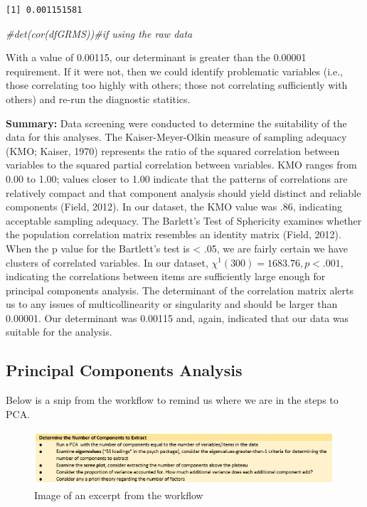 \documentclass[
  english,
]{book}
\newenvironment{Shaded}{\begin{snugshade}}{\end{snugshade}}
\newcommand{\CommentTok}[1]{\textcolor[rgb]{0.56,0.35,0.01}{\textit{#1}}}
\begin{document}
\begin{verbatim}
[1] 0.001151581
\end{verbatim}

\begin{Shaded}
\begin{Highlighting}[]
\CommentTok{#det(cor(dfGRMS))#if using the raw data}
\end{Highlighting}
\end{Shaded}

With a value of 0.00115, our determinant is greater than the 0.00001 requirement. If it were not, then we could identify problematic variables (i.e., those correlating too highly with others; those not correlating sufficiently with others) and re-run the diagnostic statitics.

\textbf{Summary:} Data screening were conducted to determine the suitability of the data for this analyses. The Kaiser-Meyer-Olkin measure of sampling adequacy (KMO; Kaiser, 1970) represents the ratio of the squared correlation between variables to the squared partial correlation between variables. KMO ranges from 0.00 to 1.00; values closer to 1.00 indicate that the patterns of correlations are relatively compact and that component analysis should yield distinct and reliable components (Field, 2012). In our dataset, the KMO value was .86, indicating acceptable sampling adequacy. The Barlett's Test of Sphericity examines whether the population correlation matrix resembles an identity matrix (Field, 2012). When the p value for the Bartlett's test is \textless{} .05, we are fairly certain we have clusters of correlated variables. In our dataset, \(\chi ^{1}(300)=1683.76, p < .001\), indicating the correlations between items are sufficiently large enough for principal components analysis. The determinant of the correlation matrix alerts us to any issues of multicollinearity or singularity and should be larger than 0.00001. Our determinant was 0.00115 and, again, indicated that our data was suitable for the analysis.

\hypertarget{principal-components-analysis}{%
\subsection{Principal Components Analysis}\label{principal-components-analysis}}

Below is a snip from the workflow to remind us where we are in the steps to PCA.

\begin{figure}
\centering
\includegraphics{images/PCA/NumComponents.png}
\caption{Image of an excerpt from the workflow}
\end{figure}
\end{document}
